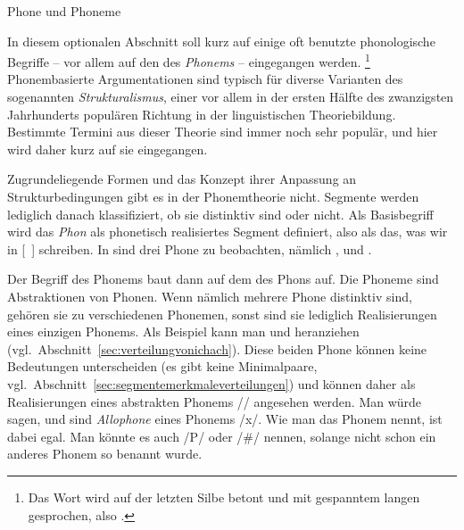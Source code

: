 \begin{Vertiefung}{Phone und Phoneme}

\label{vert:phonephoneme}

\noindent In diesem optionalen Abschnitt soll kurz auf einige oft benutzte phonologische Begriffe -- vor allem auf den des \textit{Phonems} -- eingegangen werden.%
\footnote{Das Wort wird auf der letzten Silbe betont und mit gespanntem langen \textipa{[e:]} gesprochen, also \textipa{[fo}\Akz \textipa{ne:m]}.}
Phonembasierte Argumentationen sind typisch für diverse Varianten des sogenannten \textit{Strukturalismus}, einer vor allem in der ersten Hälfte des zwanzigsten Jahrhunderts populären Richtung in der linguistischen Theoriebildung.
Bestimmte Termini aus dieser Theorie sind immer noch sehr populär, und hier wird daher kurz auf sie eingegangen.

Zugrundeliegende Formen und das Konzept ihrer Anpassung an Strukturbedingungen gibt es in der Phonemtheorie nicht.
Segmente werden lediglich danach klassifiziert, ob sie distinktiv sind oder nicht.
Als Basisbegriff wird das \textit{Phon} als phonetisch realisiertes Segment definiert, also als das, was wir in [~] schreiben.
In \textipa{[ta:k]} sind drei Phone zu beobachten, nämlich \textipa{[t]}, \textipa{[a:]} und \textipa{[k]}.


Der Begriff des Phonems baut dann auf dem des Phons auf.
Die Phoneme sind Abstraktionen von Phonen.
Wenn nämlich mehrere Phone distinktiv sind, gehören sie zu verschiedenen Phonemen, sonst sind sie lediglich Realisierungen eines einzigen Phonems.
Als Beispiel kann man \textipa{[\c{c}]} und \textipa{[X]} heranziehen (vgl.\ Abschnitt~\ref{sec:verteilungvonichach}).
Diese beiden Phone können keine Bedeutungen unterscheiden (es gibt keine Minimalpaare, vgl.\ Abschnitt~\ref{sec:segmentemerkmaleverteilungen}) und können daher als Realisierungen eines abstrakten Phonems // angesehen werden.
Man würde sagen, \textipa{[\c{c}]} und \textipa{[X]} sind \textit{Allophone} eines Phonems /x/.
Wie man das Phonem nennt, ist dabei egal.
Man könnte es auch /P/ oder /\#/ nennen, solange nicht schon ein anderes Phonem so benannt wurde.



\end{Vertiefung}

